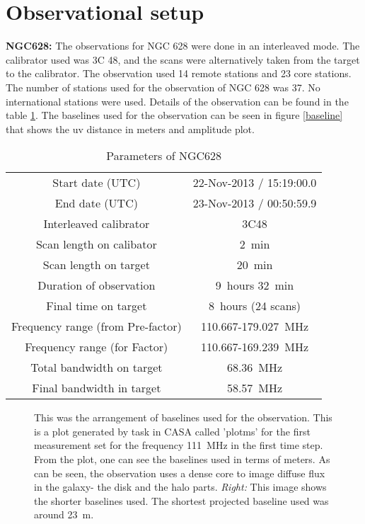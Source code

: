 \documentclass[../main/thesis_msc.tex]{subfiles}
\begin{document}
\section{Observational setup}
\textbf{NGC628:} The observations for NGC 628 were done in an interleaved mode. The calibrator used was 3C 48, and the scans were alternatively taken from the target to the calibrator. The observation used 14 remote stations and 23 core stations. The number of stations used for the observation of NGC 628 was 37. No international stations were used. Details of the observation can be found in the table \ref{setup}. The baselines used for the observation can be seen in figure \ref{baseline} that shows the uv distance in meters and amplitude plot. 
\begin{table}[h]
        \centering
        \begin{tabular}{cc}
            \hline\hline
            Start date (UTC) & 22-Nov-2013 / 15:19:00.0 \\ 
            End date (UTC) & 23-Nov-2013 / 00:50:59.9\\
            Interleaved calibrator & 3C48\\
            Scan length on calibator & 2~min\\
            Scan length on target & 20~min\\
            Duration of observation & 9~hours 32~min\\
            Final time on target & 8~hours (24 scans)\\
            Frequency range (from Pre-factor) & 110.667-179.027~MHz\\
            Frequency range (for Factor) & 110.667-169.239~MHz\\
            Total bandwidth on target & 68.36~MHz\\
            Final bandwidth in target & 58.57~MHz\\
             \hline
        \end{tabular}
        \caption{Parameters of NGC628}
        \label{setup}
    \end{table}

\begin{figure}[h]
	\centering
	\caption{This was the arrangement of baselines used for the observation. This is a plot generated by task in CASA called 'plotms' for the first measurement set for the frequency 111~MHz in the first time step. From the plot, one can see the baselines used in terms of meters. As can be seen, the observation uses a dense core to image diffuse flux in the galaxy- the disk and the halo parts. \textit{Right:} This image shows the shorter baselines used. The shortest projected baseline used was around 23~m. }
	\label{faceting}
	\end{figure}
\end{document}
